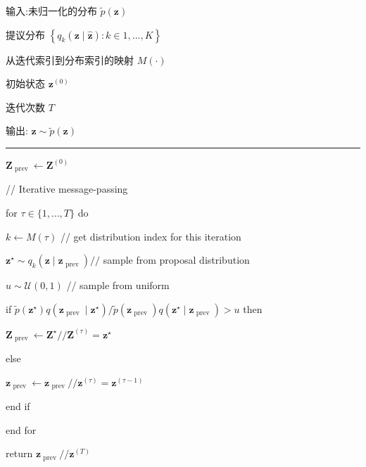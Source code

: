 \documentclass[10pt]{article}
\newcommand{\HRule}{\begin{center}\rule{0.9\linewidth}{0.2mm}\end{center}}
\begin{document}
输入:未归一化的分布 \(\widetilde{p}\left( \mathbf{z}\right)\)

提议分布 \(\left\{  {{q}_{k}\left( {\mathbf{z} \mid  \widehat{\mathbf{z}}}\right)  : k \in  1,\ldots ,K}\right\}\)

从迭代索引到分布索引的映射 \(M\left( \cdot \right)\)

初始状态 \({\mathbf{z}}^{\left( 0\right) }\)

迭代次数 \(T\)

输出: \(\mathbf{z} \sim  \widetilde{p}\left( \mathbf{z}\right)\)

\HRule

\({\mathbf{Z}}_{\text{ prev }} \leftarrow  {\mathbf{Z}}^{\left( 0\right) }\)

// Iterative message-passing

for \(\tau  \in  \{ 1,\ldots ,T\}\) do

\hspace*{1em} \(k \leftarrow  M\left( \tau \right)\) // get distribution index for this iteration

\hspace*{1em} \({\mathbf{z}}^{ \star  } \sim  {q}_{k}\left( {\mathbf{z} \mid  {\mathbf{z}}_{\text{ prev }}}\right) //\) sample from proposal distribution

\hspace*{1em} \(u \sim  \mathcal{U}\left( {0,1}\right)\) // sample from uniform

\hspace*{1em} if \(\widetilde{p}\left( {\mathbf{z}}^{ \star  }\right) q\left( {{\mathbf{z}}_{\text{ prev }} \mid  {\mathbf{z}}^{ \star  }}\right) /\widetilde{p}\left( {\mathbf{z}}_{\text{ prev }}\right) q\left( {{\mathbf{z}}^{ \star  } \mid  {\mathbf{z}}_{\text{ prev }}}\right)  > u\) then

\hspace*{2em} \({\mathbf{Z}}_{\text{ prev }} \leftarrow  {\mathbf{Z}}^{ \star  }//{\mathbf{Z}}^{\left( \tau \right) } = {\mathbf{z}}^{ \star  }\)

\hspace*{1em} else

\hspace*{2em} \({\mathbf{z}}_{\text{ prev }} \leftarrow  {\mathbf{z}}_{\text{ prev }}//{\mathbf{z}}^{\left( \tau \right) } = {\mathbf{z}}^{\left( \tau  - 1\right) }\)

\hspace*{1em} end if

end for

return \({\mathbf{z}}_{\text{ prev }}//{\mathbf{z}}^{\left( T\right) }\)
\end{document}
